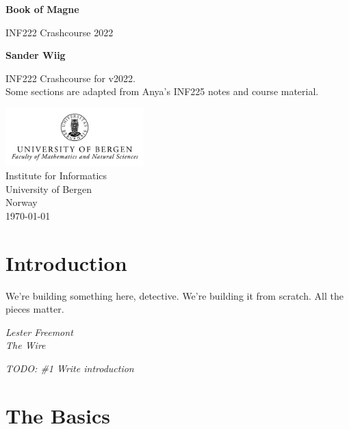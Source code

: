 \documentclass{article}
\DeclareRobustCommand{\comment}[1]{
    {\color{orange}\emph{#1}}
}
\begin{document}
    \begin{titlepage}
        \begin{center}
            \vspace*{1cm}
    
            \huge
            \textbf{Book of Magne}
    
            \vspace{0.5cm}
            \LARGE
            INF222 Crashcourse 2022
                
            \vspace{1.5cm}

            \textbf{Sander Wiig}
    
            \vfill
            
            \Large
            INF222 Crashcourse for v2022.\\
            Some sections are adapted from Anya's INF225 notes and course material.
                
            \vspace{0.5cm}
        
            \includegraphics[width=0.4\textwidth]{UiBlogoMN_gray_m_Eng.png}\\
            \Large
            Institute for Informatics\\
            University of Bergen\\
            Norway\\
            \today
                
        \end{center}
    \end{titlepage}
    \newpage
    \tableofcontents
    \newpage
    \section{Introduction}
    \epigraph{We're building something here, detective. We're building it from scratch. All the pieces matter.}{\textit{Lester Freemont \\ The Wire}}
    \comment{TODO: \#1 Write introduction}
    \section{The Basics}
\end{document}
